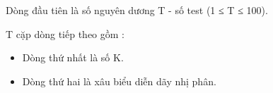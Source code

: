 Dòng đầu tiên là số nguyên dương T - số test (1 ≤ T ≤ 100).

T cặp dòng tiếp theo gồm :
\begin{itemize}
	\item Dòng thứ nhất là số K.
	\item Dòng thứ hai là xâu biểu diễn dãy nhị phân.
\end{itemize}